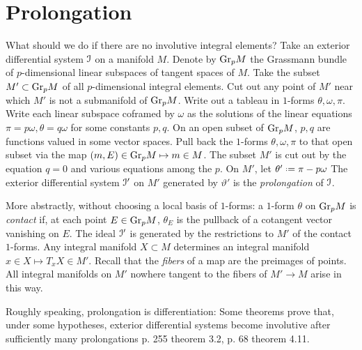\section{Prolongation}
What should we do if there are no involutive integral elements?
Take an exterior differential system \(\mathcal{I}\) on a manifold \(M\).
Denote by \(\operatorname{Gr}_{p}\!M\) the Grassmann bundle of \(p\)-dimensional linear subspaces of tangent spaces of \(M\).
Take the subset \(M' \subset \operatorname{Gr}_{p}\!M\) of all \(p\)-dimensional integral elements.
Cut out any point of \(M'\) near which \(M'\) is not a submanifold of \(\operatorname{Gr}_{p}\!M\).
Write out a tableau in \(1\)-forms \(\theta,\omega,\pi\).
Write each linear subspace coframed by \(\omega\) as the solutions of the linear equations \(\pi=p\omega,\theta=q\omega\) for some constants \(p,q\).
On an open subset of \(\operatorname{Gr}_{p}\!M\), \(p,q\) are functions valued in some vector spaces.
Pull back the \(1\)-forms \(\theta, \omega, \pi\) to that open subset via the map  \((m,E) \in \operatorname{Gr}_{p}\!M \mapsto m \in M\).
The subset \(M'\) is cut out by the equation \(q=0\) and various equations among the \(p\).
On \(M'\), let \(\theta'\defeq\pi-p\omega\)
The exterior differential system \(\mathcal{I}'\) on \(M'\) generated by \(\vartheta'\) is the \emph{prolongation} of \(\mathcal{I}\).

More abstractly, without choosing a local basis of \(1\)-forms: a \(1\)-form \(\theta\) on \(\operatorname{Gr}_{p}\!M\) is \emph{contact} if, at each point \(E\in\operatorname{Gr}_{p}\!M\),  \(\theta_E\) is the pullback of a cotangent vector vanishing on \(E\).
The ideal \(\mathcal{I}'\) is generated by the restrictions to \(M'\) of the contact \(1\)-forms.
Any integral manifold \(X \subset M\) determines an integral manifold \(x \in X \mapsto T_x X \in M'\).
Recall that the \emph{fibers} of a map are the preimages of points.
All integral manifolds on \(M'\) nowhere tangent to the fibers of \(M' \to M\) arise in this way.

Roughly speaking, prolongation is differentiation:
Some theorems prove that, under some hypotheses, exterior differential systems become involutive after sufficiently many prolongations \cite{BCGGG:1991} p. 255 theorem 3.2, \cite{Malgrange:2005} p. 68 theorem 4.11.


